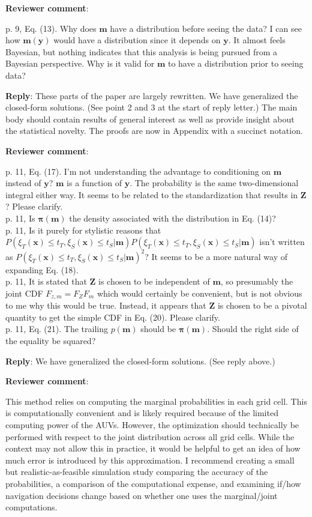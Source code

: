 \documentclass[a4paper]{article}
\newcommand{\bm}{ {\boldsymbol m} }
\newcommand{\bx}{ {\boldsymbol x} }
\newcommand{\by}{ {\boldsymbol y} }
\newcommand{\bZ}{ {\boldsymbol Z} }
\newcommand{\bpi}{ {\boldsymbol \pi} }
\def\revcom{\textbf{Reviewer comment}}
\def\reply{\textbf{Reply}}
\begin{document}
\begin{answers}
\item{\revcom  :}\label{r2c6}

p. 9, Eq. (13). Why does $\bm$ have a distribution before seeing the data? I can see how $\bm(\by)$ would have a distribution since it depends on $\by$. It almost feels Bayesian, but nothing indicates that this analysis is being pursued from a Bayesian perspective. Why is it valid for $\bm$ to have a distribution prior to seeing data?

\reply: These parts of the paper are largely rewritten. We have generalized the closed-form solutions. (See point 2 and 3 at the start of reply letter.) The main body should contain results of general interest as well as provide insight about the statistical novelty. The proofs are now in Appendix with a succinct notation.

\item{\revcom :}\label{r2c7}

p. 11, Eq. (17). I’m not understanding the advantage to conditioning on $\bm$ instead of $\by$? $\bm$ is a function of $\by$. The probability is the same two-dimensional integral either way. It seems to be related to the standardization that results in $\bZ$? Please clarify.\\
p. 11, Is $\bpi(\bm)$ the density associated with the distribution in Eq. (14)? \\
p. 11, Is it purely for stylistic reasons that $P(\xi_T(\bx) \leq t_T, \xi_S(\bx) \leq t_S |\bm)P(\xi_T(\bx) \leq t_T, \xi_S(\bx) \leq t_S |\bm)$ isn’t written as $P(\xi_T(\bx) \leq t_T, \xi_S(\bx) \leq t_S |\bm)^2$? It seems to be a more natural way of expanding Eq. (18). \\
p. 11, It is stated that $\bZ$ is chosen to be independent of $\bm$, so presumably the joint CDF $F_{z,m}=F_{Z}F_m$ which would certainly be convenient, but is not obvious to me why this would be true. 
Instead, it appears that $\bZ$ is chosen to be a pivotal quantity to get the simple CDF in Eq. (20). Please clarify.\\
p. 11, Eq. (21). The trailing $p(\bm)$ should be $\bpi(\bm)$. Should the right side of the equality be squared? 

\reply: We have generalized the closed-form solutions. (See reply above.)

\item{\revcom :}\label{r2c12}

This method relies on computing the marginal probabilities in each grid cell. This is computationally convenient and is likely required because of the limited computing power of the AUVs. However, the optimization should technically be performed with respect to the joint distribution across all grid cells. While the context may not allow this in practice, it would be helpful to get an idea of how much error is introduced by this approximation. I recommend creating a small but realistic-as-feasible simulation study comparing the accuracy of the probabilities, a comparison of the computational expense, and examining if/how navigation decisions change based on whether one uses the marginal/joint computations. 


\end{answers}
\end{document}
